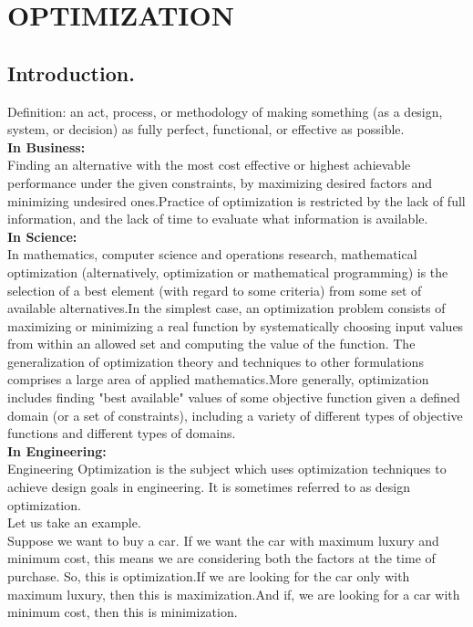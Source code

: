 \chapter{OPTIMIZATION}
\section{Introduction.}Definition: an act, process, or methodology of making something (as a design, system, or decision) as fully perfect, functional, or effective as possible. \\
\textbf{In Business:}\\
Finding an alternative with the most cost effective or highest achievable performance under the given constraints, by maximizing desired factors and minimizing undesired ones.Practice of optimization is restricted by the lack of full information, and the lack of time to evaluate what information is available.\\
\textbf{In Science:}\\
In mathematics, computer science and operations research, mathematical optimization (alternatively, optimization or mathematical programming) is the selection of a best element (with regard to some criteria) from some set of available alternatives.In the simplest case, an optimization problem consists of maximizing or minimizing a real function by systematically choosing input values from within an allowed set and computing the value of the function. The generalization of optimization theory and techniques to other formulations comprises a large area of applied mathematics.More generally, optimization includes finding "best available" values of some objective function given a defined domain (or a set of constraints), including a variety of different types of objective functions and different types of domains.\\
\textbf{In Engineering:}\\
Engineering Optimization is the subject which uses optimization techniques to achieve design goals in engineering. It is sometimes referred to as design optimization.\\
Let us take an example.\\
Suppose we want to buy a car. If we want the car with maximum luxury and minimum cost, this means we are considering both the factors at the time of purchase. So, this is optimization.If we are looking for the car only with maximum luxury, then this is 	maximization.And if, we are looking for a car with minimum cost, then this is minimization.\\
